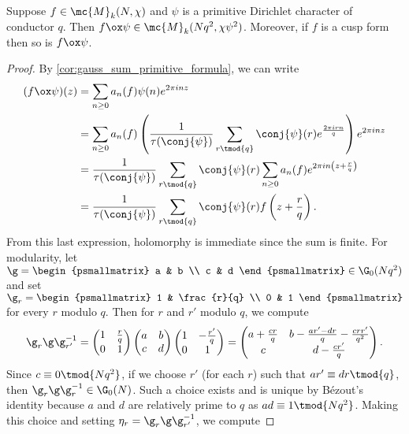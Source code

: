     \begin{proposition}\label{prop:twisted_holomorphic_forms_primitive}
      Suppose $f \in \mc{M}_{k}(N,\chi)$ and $\psi$ is a primitive Dirichlet character of conductor $q$. Then $f \ox \psi \in \mc{M}_{k}(Nq^{2},\chi\psi^{2})$. Moreover, if $f$ is a cusp form then so is $f \ox \psi$.
    \end{proposition}
    \begin{proof}
      By \cref{cor:gauss_sum_primitive_formula}, we can write
      \begin{align*}
        (f \ox \psi)(z) &= \sum_{n \ge 0}a_{n}(f)\psi(n)e^{2\pi inz} \\
        &= \sum_{n \ge 0}a_{n}(f)\left(\frac{1}{\tau(\conj{\psi})}\sum_{r \tmod{q}}\conj{\psi}(r)e^{\frac{2\pi irn}{q}}\right)e^{2\pi inz} \\
        &= \frac{1}{\tau(\conj{\psi})}\sum_{r \tmod{q}}\conj{\psi}(r)\sum_{n \ge 0}a_{n}(f)e^{2\pi in\left(z+\frac{r}{q}\right)} \\
        &= \frac{1}{\tau(\conj{\psi})}\sum_{r \tmod{q}}\conj{\psi}(r)f\left(z+\frac{r}{q}\right).
      \end{align*}
      From this last expression, holomorphy is immediate since the sum is finite. For modularity, let $\g = \begin{psmallmatrix} a & b \\ c & d \end{psmallmatrix} \in \G_{0}(Nq^{2})$ and set $\g_{r} = \begin{psmallmatrix} 1 & \frac{r}{q} \\ 0 & 1 \end{psmallmatrix}$ for every $r$ modulo $q$. Then for $r$ and $r'$ modulo $q$, we compute
      \[
        \g_{r}\g\g_{r'}^{-1} = \begin{pmatrix} 1 & \frac{r}{q} \\ 0 & 1 \end{pmatrix}\begin{pmatrix} a & b \\ c & d \end{pmatrix}\begin{pmatrix} 1 & -\frac{r'}{q} \\ 0 & 1 \end{pmatrix} = \begin{pmatrix} a+\frac{cr}{q} & b-\frac{ar'-dr}{q}-\frac{crr'}{q^{2}} \\ c & d-\frac{cr'}{q} \end{pmatrix}.
      \]
      Since $c \equiv 0 \tmod{Nq^{2}}$, if we choose $r'$ (for each $r$) such that $ar' \equiv dr \tmod{q}$, then $\g_{r}\g\g_{r}^{-1} \in \G_{0}(N)$. Such a choice exists and is unique by B\'ezout's identity because $a$ and $d$ are relatively prime to $q$ as $ad \equiv 1 \tmod{Nq^{2}}$. Making this choice and setting $\eta_{r} = \g_{r}\g\g_{r'}^{-1}$, we compute

\end{proof}
